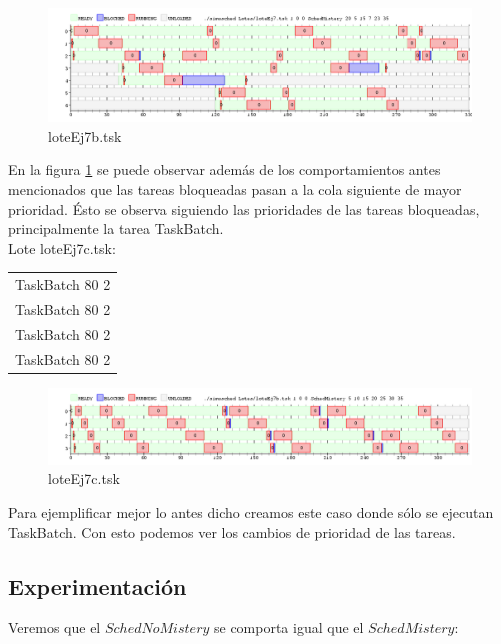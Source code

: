\begin{figure}[H]
  \centering
    \includegraphics[width=1.1\textwidth]{imagenes/test1ej7.png}
  \caption{loteEj7b.tsk}
  \label{fig:ej7b}
\end{figure}

En la figura \ref{fig:ej7b} se puede observar adem\'as de los comportamientos antes mencionados que las tareas bloqueadas pasan a la cola siguiente 
de mayor prioridad. \'Esto se observa siguiendo las prioridades de las tareas bloqueadas, principalmente la tarea TaskBatch.\\



Lote loteEj7c.tsk:
\begin{table}[H]
\begin{tabular}{ | l |}
  \hline
TaskBatch 80 2\\
TaskBatch 80 2\\
TaskBatch 80 2\\
TaskBatch 80 2\\
  \hline
\end{tabular}
\end{table}

\begin{figure}[H]
  \centering
    \includegraphics[width=1.1\textwidth]{imagenes/test2ej7.png}
  \caption{loteEj7c.tsk}
  \label{fig:ej7c}
\end{figure}


Para ejemplificar mejor lo antes dicho creamos este caso donde s\'olo se ejecutan TaskBatch. Con esto podemos ver los cambios de prioridad de las tareas.


\subsection{Experimentación}

Veremos que el $SchedNoMistery$ se comporta igual que el $SchedMistery$:

